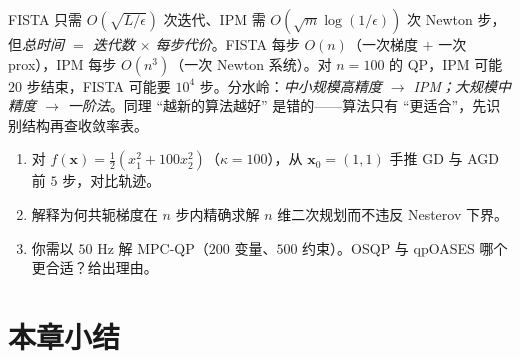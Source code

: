 \begin{pitfall}
FISTA 只需 $O(\sqrt{L/\epsilon})$ 次迭代、IPM 需 $O(\sqrt m\log(1/\epsilon))$ 次 Newton 步，但\emph{总时间 $=$ 迭代数 $\times$ 每步代价}。FISTA 每步 $O(n)$（一次梯度 $+$ 一次 prox），IPM 每步 $O(n^3)$（一次 Newton 系统）。对 $n=100$ 的 QP，IPM 可能 $20$ 步结束，FISTA 可能要 $10^4$ 步。分水岭：\emph{中小规模高精度 $\to$ IPM；大规模中精度 $\to$ 一阶法}。同理 “越新的算法越好” 是错的——算法只有 “更适合”，先识别结构再查收敛率表。
\end{pitfall}

\begin{practice}
\begin{enumerate}
  \item 对 $f(\mathbf x)=\tfrac12(x_1^2+100x_2^2)$（$\kappa=100$），从 $\mathbf x_0=(1,1)$ 手推 GD 与 AGD 前 $5$ 步，对比轨迹。
  \item 解释为何共轭梯度在 $n$ 步内精确求解 $n$ 维二次规划而不违反 Nesterov 下界。
  \item 你需以 $50$ Hz 解 MPC-QP（$200$ 变量、$500$ 约束）。OSQP 与 qpOASES 哪个更合适？给出理由。
\end{enumerate}
\end{practice}

\section*{本章小结}

